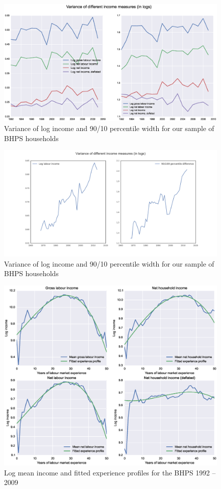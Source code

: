 \begin{figure}
\includegraphics[width=\columnwidth]{BHPS_incvar}
\caption{Variance of log income and 90/10 percentile width for our sample of
BHPS households}
\label{fig:bhps_incvar}
\end{figure}

\begin{figure}
\includegraphics[width=\columnwidth]{PSID_incvar}
\caption{Variance of log income and 90/10 percentile width for our sample of
BHPS households}
\label{fig:psid_incvar}
\end{figure}

\begin{figure}
\includegraphics[width=\columnwidth]{BHPS_fitted_profiles}
\caption{Log mean income and fitted experience profiles for the BHPS 1992 
-- 2009}
\label{fig:bhps_profiles}
\end{figure}




